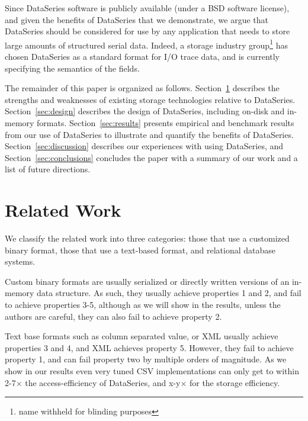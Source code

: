\documentclass{acm_proc_article-sp}
\begin{document}
Since DataSeries software is publicly available (under a BSD software
license), and given the benefits of DataSeries that we demonstrate, we
argue that DataSeries should be considered for use by any application
that needs to store large amounts of structured serial data. Indeed, a
storage industry group\footnote{name withheld for blinding purposes}
has chosen DataSeries as a standard format for I/O trace data, and is
currently specifying the semantics of the fields.

The remainder of this paper is organized as follows.
Section~\ref{sec:related} describes the strengths and weaknesses of
existing storage technologies relative to DataSeries.
Section~\ref{sec:design} describes the design of DataSeries, including
on-disk and in-memory formats.
Section~\ref{sec:results} presents empirical and benchmark results
from our use of DataSeries to illustrate and quantify the benefits of
DataSeries.  Section~\ref{sec:discussion} describes our experiences
with using DataSeries, and Section~\ref{sec:conclusions} concludes the
paper with a summary of our work and a list of future directions.

\section{Related Work}\label{sec:related}

We classify the related work into three categories:
those that use a customized binary format, those that use a
text-based format, and relational database systems. 

Custom binary formats are usually serialized or directly written
versions of an in-memory data structure.  As such, they usually
achieve properties 1 and 2, and fail to achieve properties 3-5,
although as we will show in the results, unless the authors are
careful, they can also fail to achieve property 2.

Text base formats such as column separated value, or XML usually
achieve properties 3 and 4, and XML achieves property 5.  However,
they fail to achieve property 1, and can fail property two by multiple
orders of magnitude.  As we show in our results even very tuned CSV
implementations can only get to within 2-7$\times$ the
access-efficiency of DataSeries, and x-y$\times$ for the storage
efficiency.  
\end{document}
